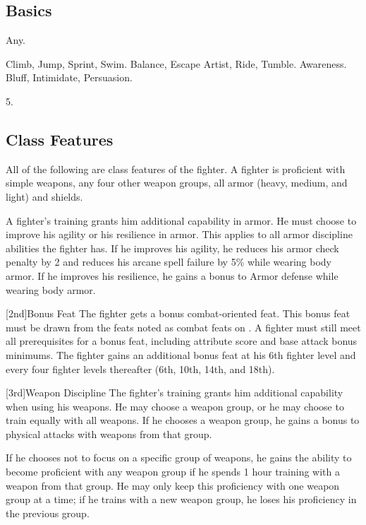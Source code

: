 \subsection{Basics}

 Any.

 Climb, Jump, Sprint, Swim.
 Balance, Escape Artist, Ride, Tumble.
 Awareness.
 Bluff, Intimidate, Persuasion.

 5.

\subsection{Class Features}
All of the following are class features of the fighter.
 A fighter is proficient with simple weapons, any four other weapon groups,  all armor (heavy, medium, and light) and shields.

A fighter's training grants him additional capability in armor.
He must choose to improve his agility or his resilience in armor.
This applies to all armor discipline abilities the fighter has.
If he improves his agility, he reduces his armor check penalty by 2 and reduces his arcane spell failure by 5\% while wearing body armor.
If he improves his resilience, he gains a  bonus to Armor defense while wearing body armor.

[2nd]{Bonus Feat}
The fighter gets a bonus combat-oriented feat.
This bonus feat must be drawn from the feats noted as combat feats on .
A fighter must still meet all prerequisites for a bonus feat, including attribute score and base attack bonus minimums.
The fighter gains an additional bonus feat at his 6th fighter level and every four fighter levels thereafter (6th, 10th, 14th, and 18th).

[3rd]{Weapon Discipline}
The fighter's training grants him additional capability when using his weapons.
He may choose a weapon group, or he may choose to train equally with all weapons.
If he chooses a weapon group, he gains a  bonus to physical attacks with weapons from that group.

If he chooses not to focus on a specific group of weapons, he gains the ability to become proficient with any weapon group if he spends 1 hour training with a weapon from that group.
He may only keep this proficiency with one weapon group at a time; if he trains with a new weapon group, he loses his proficiency in the previous group.


